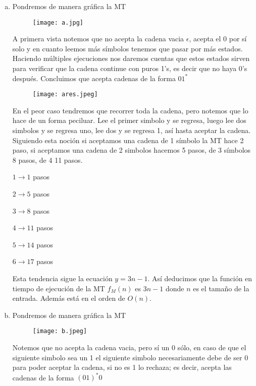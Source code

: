 \documentclass[12pt,letterpaper]{article}
\begin{document}
\begin{enumerate}[a.]
    \item Pondremos de manera gráfica la MT
    \begin{figure}[htb]
        \centering
        \texttt{[image: a.jpg]}
    \end{figure}
    

    A primera vista notemos que no acepta la cadena vacia $\epsilon$, acepta el 0 por sí solo y en cuanto leemos más símbolos tenemos que pasar por más estados. Haciendo múltiples ejecuciones nos daremos cuentas que estos estados sirven para verificar que la cadena continue con puros 1's, es decir que no haya 0's después. Concluimos que acepta cadenas de la forma $01^*$
    
    \begin{figure}[htb]
        \centering
        \texttt{[image: ares.jpeg]}
    \end{figure}
    
    En el peor caso tendremos que recorrer toda la cadena, pero notemos que lo hace de un forma peciluar. Lee el primer simbolo y se regresa, luego lee dos simbolos y se regresa uno, lee dos y se regresa 1, así hasta aceptar la cadena. Siguiendo esta noción si aceptamos una cadena de 1 símbolo la MT hace 2 paso, si aceptamos una cadena de 2 simbolos hacemos 5 pasos, de 3 símbolos 8 pasos, de 4 11 pasos. 
    
    $1 \xrightarrow{}1$ pasos
    
    $2 \xrightarrow{}5$ pasos
    
    $3 \xrightarrow{}8$ pasos
    
    $4 \xrightarrow{}11$ pasos
    
    $5 \xrightarrow{}14$ pasos
    
    $6 \xrightarrow{}17$ pasos
    
    Esta tendencia sigue la ecuación $y = 3n -1$. Así deducimos que la función en tiempo de ejecución de la MT $f_M{(n)}$ es $3n-1$ donde $n$ es el tamaño de la entrada. Además está en el orden de $O(n)$.
    
    \item Pondremos de manera gráfica la MT
    
    \begin{figure}[htb]
        \centering
        \texttt{[image: b.jpeg]}
    \end{figure}
    
    Notemos que no acepta la cadena vacia, pero sí un 0 sólo, en caso de que el siguiente simbolo sea un 1 el siguiente simbolo necesariamente debe de ser 0 para poder aceptar la cadena, si no es 1 lo rechaza; es decir, acepta las cadenas de la forma $(01)^*0$
    

\end{enumerate}
\end{document}
